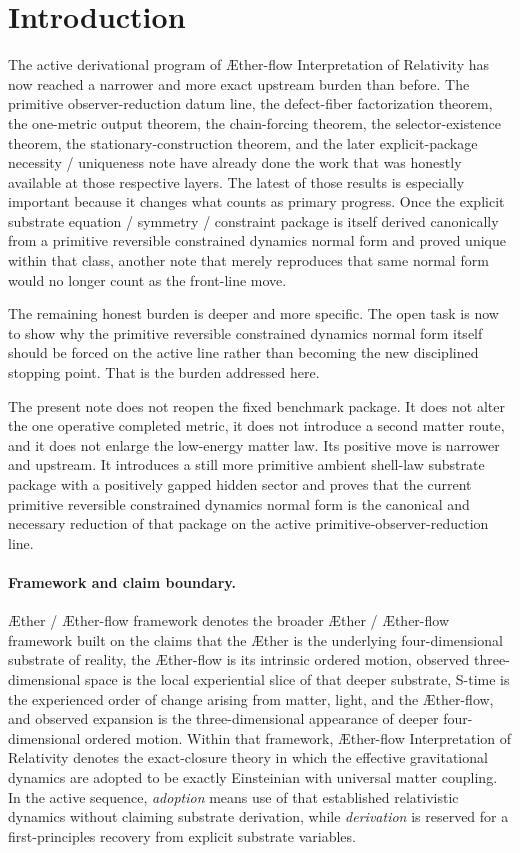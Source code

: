 \documentclass[11pt]{article}
\newcommand{\Aether}{\AE{}ther}
\newcommand{\Aflow}{\AE{}ther-flow}
\newcommand{\TheoryName}{\Aflow{} Interpretation of Relativity}
\newcommand{\TheoryProgram}{\Aether{} / \Aflow{} framework}
\begin{document}
\section{Introduction}

The active derivational program of \TheoryName{} has now reached a narrower and more exact upstream burden than before. The primitive observer-reduction datum line, the defect-fiber factorization theorem, the one-metric output theorem, the chain-forcing theorem, the selector-existence theorem, the stationary-construction theorem, and the later explicit-package necessity / uniqueness note have already done the work that was honestly available at those respective layers. The latest of those results is especially important because it changes what counts as primary progress. Once the explicit substrate equation / symmetry / constraint package is itself derived canonically from a primitive reversible constrained dynamics normal form and proved unique within that class, another note that merely reproduces that same normal form would no longer count as the front-line move.

The remaining honest burden is deeper and more specific. The open task is now to show why the primitive reversible constrained dynamics normal form itself should be forced on the active line rather than becoming the new disciplined stopping point. That is the burden addressed here.

The present note does not reopen the fixed benchmark package. It does not alter the one operative completed metric, it does not introduce a second matter route, and it does not enlarge the low-energy matter law. Its positive move is narrower and upstream. It introduces a still more primitive ambient shell-law substrate package with a positively gapped hidden sector and proves that the current primitive reversible constrained dynamics normal form is the canonical and necessary reduction of that package on the active primitive-observer-reduction line.

\paragraph{Framework and claim boundary.}
\TheoryProgram{} denotes the broader \Aether{} / \Aflow{} framework built on the claims that the \Aether{} is the underlying four-dimensional substrate of reality, the \Aflow{} is its intrinsic ordered motion, observed three-dimensional space is the local experiential slice of that deeper substrate, S-time is the experienced order of change arising from matter, light, and the \Aflow{}, and observed expansion is the three-dimensional appearance of deeper four-dimensional ordered motion. Within that framework, \TheoryName{} denotes the exact-closure theory in which the effective gravitational dynamics are adopted to be exactly Einsteinian with universal matter coupling. In the active sequence, \emph{adoption} means use of that established relativistic dynamics without claiming substrate derivation, while \emph{derivation} is reserved for a first-principles recovery from explicit substrate variables.
\end{document}
